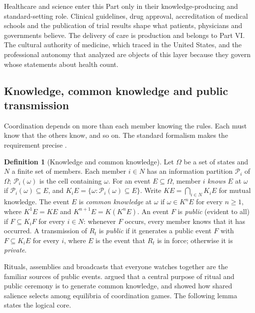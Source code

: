 \documentclass[11pt,letterpaper]{article}
\theoremstyle{definition}
\newtheorem{definition}[theorem]{Definition}
\theoremstyle{remark}
\begin{document}
Healthcare and science enter this Part only in their knowledge-producing and standard-setting role. Clinical guidelines, drug approval, accreditation of medical schools and the publication of trial results shape what patients, physicians and governments believe. The delivery of care is production and belongs to Part VI. The cultural authority of medicine, which \citet{starr1982} traced in the United States, and the professional autonomy that \citet{freidson1970} analyzed are objects of this layer because they govern whose statements about health count.

\subsection{Knowledge, common knowledge and public transmission}

Coordination depends on more than each member knowing the rules. Each must know that the others know, and so on. The standard formalism makes the requirement precise \citep{lewis1969,aumann1976}.

\begin{definition}[Knowledge and common knowledge]
\label{def:ideological-power:public-signal}
Let $\Omega$ be a set of states and $N$ a finite set of members. Each member $i\in N$ has an information partition $\mathcal{P}_i$ of $\Omega$; $\mathcal{P}_i(\omega)$ is the cell containing $\omega$. For an event $E\subseteq\Omega$, member $i$ \emph{knows} $E$ at $\omega$ if $\mathcal{P}_i(\omega)\subseteq E$, and $K_iE=\{\omega:\mathcal{P}_i(\omega)\subseteq E\}$. Write $K E=\bigcap_{i\in N}K_iE$ for mutual knowledge. The event $E$ is \emph{common knowledge} at $\omega$ if $\omega\in K^nE$ for every $n\geq 1$, where $K^1E=KE$ and $K^{n+1}E=K(K^nE)$. An event $F$ is \emph{public} (evident to all) if $F\subseteq K_iF$ for every $i\in N$: whenever $F$ occurs, every member knows that it has occurred. A transmission of $R_t$ is \emph{public} if it generates a public event $F$ with $F\subseteq K_iE$ for every $i$, where $E$ is the event that $R_t$ is in force; otherwise it is \emph{private}.
\end{definition}

Rituals, assemblies and broadcasts that everyone watches together are the familiar sources of public events. \citet{chwe2001} argued that a central purpose of ritual and public ceremony is to generate common knowledge, and \citet{schelling1960} showed how shared salience selects among equilibria of coordination games. The following lemma states the logical core.
\end{document}
